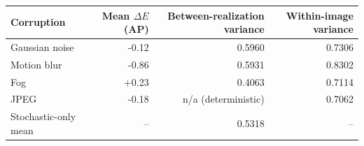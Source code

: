 \begin{tabular}{lrrr}
\toprule
Corruption & Mean $\Delta E$ (AP) & Between-realization variance & Within-image variance \\
\midrule
Gaussian noise & -0.12 & 0.5960 & 0.7306 \\
Motion blur & -0.86 & 0.5931 & 0.8302 \\
Fog & +0.23 & 0.4063 & 0.7114 \\
JPEG & -0.18 & n/a (deterministic) & 0.7062 \\
Stochastic-only mean & -- & 0.5318 & -- \\
\bottomrule
\end{tabular}
